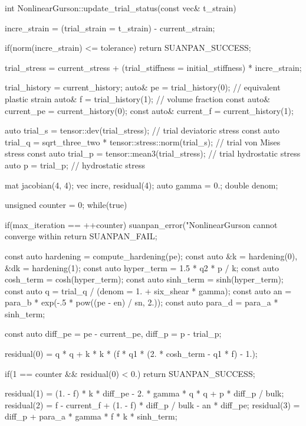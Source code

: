 \begin{cppcode}
int NonlinearGurson::update_trial_status(const vec& t_strain) {
    incre_strain = (trial_strain = t_strain) - current_strain;

    if(norm(incre_strain) <= tolerance) return SUANPAN_SUCCESS;

    trial_stress = current_stress + (trial_stiffness = initial_stiffness) * incre_strain;

    trial_history = current_history;
    auto& pe = trial_history(0); // equivalent plastic strain
    auto& f = trial_history(1);  // volume fraction
    const auto& current_pe = current_history(0);
    const auto& current_f = current_history(1);

    auto trial_s = tensor::dev(trial_stress);                            // trial deviatoric stress
    const auto trial_q = sqrt_three_two * tensor::stress::norm(trial_s); // trial von Mises stress
    const auto trial_p = tensor::mean3(trial_stress);                    // trial hydrostatic stress
    auto p = trial_p;                                                    // hydrostatic stress

    mat jacobian(4, 4);
    vec incre, residual(4);
    auto gamma = 0.;
    double denom;

    unsigned counter = 0;
    while(true) {
        if(max_iteration == ++counter) {
            suanpan_error("NonlinearGurson cannot converge within %
            return SUANPAN_FAIL;
        }

        const auto hardening = compute_hardening(pe);
        const auto &k = hardening(0), &dk = hardening(1);
        const auto hyper_term = 1.5 * q2 * p / k;
        const auto cosh_term = cosh(hyper_term);
        const auto sinh_term = sinh(hyper_term);
        const auto q = trial_q / (denom = 1. + six_shear * gamma);
        const auto an = para_b * exp(-.5 * pow((pe - en) / sn, 2.));
        const auto para_d = para_a * sinh_term;

        const auto diff_pe = pe - current_pe, diff_p = p - trial_p;

        residual(0) = q * q + k * k * (f * q1 * (2. * cosh_term - q1 * f) - 1.);

        if(1 == counter && residual(0) < 0.) return SUANPAN_SUCCESS;

        residual(1) = (1. - f) * k * diff_pe - 2. * gamma * q * q + p * diff_p / bulk;
        residual(2) = f - current_f + (1. - f) * diff_p / bulk - an * diff_pe;
        residual(3) = diff_p + para_a * gamma * f * k * sinh_term;

}}
\end{cppcode}
